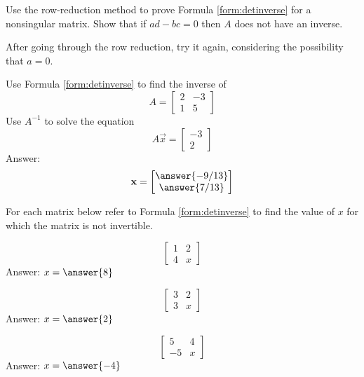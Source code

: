 \documentclass{ximera}
\begin{document}
\begin{problem}\label{prob:inverseformula}
Use the row-reduction method to prove Formula \ref{form:detinverse} for a nonsingular matrix.  Show that if $ad-bc=0$ then $A$ does not have an inverse.
\begin{hint}After going through the row reduction, try it again, considering the possibility that $a=0$.
\end{hint}
\end{problem}


\begin{problem}\label{prob:useformforinv}
Use Formula \ref{form:detinverse} to find the inverse of $$A=\begin{bmatrix}2&-3\\1&5\end{bmatrix}$$
Use $A^{-1}$ to solve the equation
$$A\vec{x}=\begin{bmatrix}-3\\2\end{bmatrix}$$
Answer:
$$\vec{x}=\begin{bmatrix}\answer{-9/13}\\\answer{7/13}\end{bmatrix}$$

\end{problem}

\begin{problem}
For each matrix below refer to  Formula \ref{form:detinverse} to find the value of $x$ for which the matrix is not invertible.  
\begin{problem}\label{prob:notinv1}
$$\begin{bmatrix}1&2\\4&x\end{bmatrix}$$
Answer: $x=\answer{8}$
\end{problem}
\begin{problem}\label{prob:notinv2}
$$\begin{bmatrix}3&2\\3&x\end{bmatrix}$$
Answer: $x=\answer{2}$
\end{problem}
\begin{problem}\label{prob:notinv3}
$$\begin{bmatrix}5&4\\-5&x\end{bmatrix}$$
Answer: $x=\answer{-4}$
\end{problem}
\end{problem}
\end{document}

